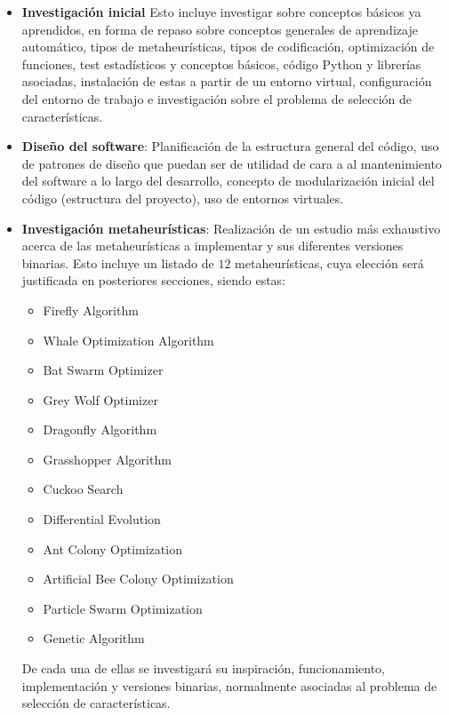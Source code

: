 \begin{itemize}
      \item \textbf{Investigación inicial}
            Esto incluye investigar sobre conceptos básicos ya aprendidos, en forma de repaso sobre conceptos generales de aprendizaje automático, tipos de metaheurísticas, tipos de codificación, optimización de funciones, test estadísticos y conceptos básicos, código Python y librerías asociadas, instalación de estas a partir de un entorno virtual, configuración del entorno de trabajo e investigación sobre el problema de selección de características.

      \item \textbf{Diseño del software}: Planificación de la estructura general del código, uso de patrones de diseño que puedan ser de utilidad de cara a al mantenimiento del software a lo largo del desarrollo, concepto de modularización inicial del código (estructura del proyecto), uso de entornos virtuales.
      \item \textbf{Investigación metaheurísticas}: Realización de un estudio más exhaustivo acerca de las metaheurísticas a implementar y sus diferentes versiones binarias. Esto incluye un listado de $12$ metaheurísticas, cuya elección será justificada en posteriores secciones, siendo estas:
            \begin{itemize}
                  \item Firefly Algorithm
                  \item Whale Optimization Algorithm
                  \item Bat Swarm Optimizer
                  \item Grey Wolf Optimizer
                  \item Dragonfly Algorithm
                  \item Grasshopper Algorithm
                  \item Cuckoo Search
                  \item Differential Evolution
                  \item Ant Colony Optimization
                  \item Artificial Bee Colony Optimization
                  \item Particle Swarm Optimization
                  \item Genetic Algorithm
            \end{itemize}
            De cada una de ellas se investigará su inspiración, funcionamiento, implementación y versiones binarias, normalmente asociadas al problema de selección de características.

\end{itemize}

